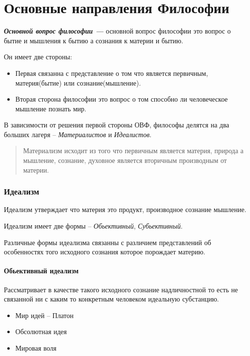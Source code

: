 \documentclass[a4paper, 14pt]{extreport}
\begin{document}
\chapter{Основные направления Философии}

\textbf{\emph{Основной вопрос философии ---}}
основной вопрос философии это вопрос о бытие и мышления к бытию а
сознания к материи и бытию.


Он имеет две стороны:

\begin{itemize}
\item
  Первая связанна с представление о том что является первичным,
  материя(бытие) или сознание(мышление).
\item
  Вторая сторона философии это вопрос о том способно ли человеческое
  мышление познать мир.
\end{itemize}

В зависимости от решения первой стороны ОВФ, философы делятся на два
больших лагеря -- \emph{Материалистов} и \emph{Идеалистов}.

\begin{quote}
Материализм исходит из того что первичным является материя, природа а
мышление, сознание, духовное является вторичным производным от материи.
\end{quote}

\subsection{Идеализм}

Идеализм утверждает что материя это продукт, производное сознание
мышление.

Идеализм имеет две формы -- \emph{Обьективный}, \emph{Субьективный}.

Различные формы идеализма связанны с различием представлений об
особенностях того исходного сознания которое порождает материю.

\subsubsection{Обьективный идеализм}

Рассматривает в качестве такого исходного сознание надличностной то есть
не связанной ни с каким то конкретным человеком идеальную субстанцию.

\begin{itemize}

\item
  Мир идей -- Платон
\item
  Обсолютная идея
\item
  Мировая воля
\end{itemize}
\end{document}
